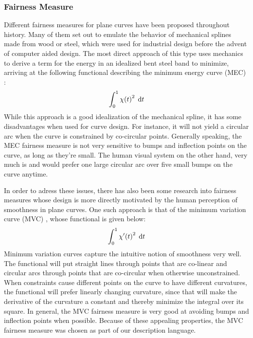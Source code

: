 \documentclass[a4paper]{article}
\begin{document}
			\subsubsection{Fairness Measure}
			\label{section:fairness_measure}

				Different fairness measures for plane curves have been proposed throughout history. Many of them set out to emulate the behavior of mechanical splines made from wood or steel, which were used for industrial design before the advent of computer aided design. The most direct approach of this type uses mechanics to derive a term for the energy in an idealized bent steel band to minimize, arriving at the following functional describing the minimum energy curve (MEC) \cite{paper-mec}:
				\begin{equation*}
					\int_{0}^{1} \chi\!\left( t \right)^2 \; \mathrm{d}t
				\end{equation*}
				While this approach is a good idealization of the mechanical spline, it has some disadvantages when used for curve design. For instance, it will not yield a circular arc when the curve is constrained by co-circular points. Generally speaking, the MEC fairness measure is not very sensitive to bumps and inflection points on the curve, as long as they're small. The human visual system on the other hand, very much is and would prefer one large circular arc over five small bumps on the curve anytime.

				In order to adress these issues, there has also been some research into fairness measures whose design is more directly motivated by the human perception of smoothness in plane curves. One such approach is that of the minimum variation curve (MVC) \cite{thesis-mvc}, whose functional is given below:
				\begin{equation*}
					\int_{0}^{1} \chi'\!\left( t \right)^2 \; \mathrm{d}t
				\end{equation*}
				Minimum variation curves capture the intuitive notion of smoothness very well. The functional will put straight lines through points that are co-linear and circular arcs through points that are co-circular when otherwise unconstrained. When constraints cause different points on the curve to have different curvatures, the functional will prefer linearly changing curvature, since that will make the derivative of the curvature a constant and thereby minimize the integral over its square. In general, the MVC fairness measure is very good at avoiding bumps and inflection points when possible. Because of these appealing properties, the MVC fairness measure was chosen as part of our description language.
\end{document}
